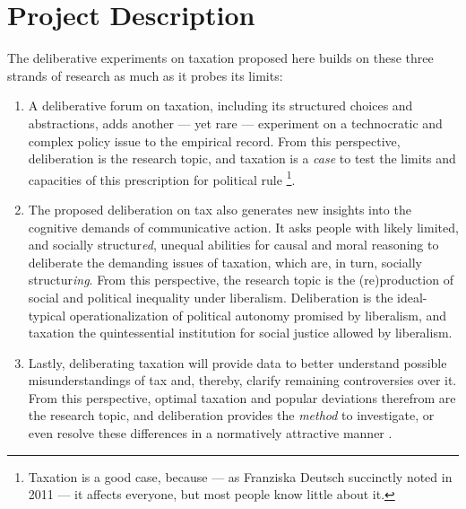 \section{Project Description}



The deliberative experiments on taxation proposed here builds on these three strands of research as much as it probes its limits:

\begin{enumerate}
\item 
	A deliberative forum on taxation, including its structured choices and abstractions, adds another --- yet rare --- experiment on a technocratic and complex policy issue to the empirical record.
	From this perspective, deliberation is the research topic, and taxation is a \emph{case} to test the limits and capacities of this prescription for political {rule}
	\footnote{
		Taxation is a good case, because --- as Franziska Deutsch succinctly noted in 2011 --- it affects everyone, but most people know little about it.
	}.
	
\item The proposed deliberation on tax also generates new insights into the cognitive demands of communicative action.
	It asks people with likely limited, and socially structur\emph{ed}, unequal abilities for causal and moral reasoning to deliberate the demanding issues of taxation, which are, in turn, socially structur\emph{ing}.
	From this perspective, the research topic is the (re)production of social and political inequality under liberalism.
	Deliberation is the ideal-typical operationalization of political autonomy promised by liberalism, and taxation the quintessential institution for social justice allowed by liberalism. %
	
\item Lastly, deliberating taxation will provide data to better understand possible misunderstandings of tax and, thereby, clarify remaining controversies over it.
	From this perspective, optimal taxation and popular deviations therefrom are the research topic, and deliberation provides the \emph{method} to investigate, or even resolve these differences in a normatively attractive manner \citep{Rawls-1971,Habermas-1984}.
\end{enumerate}

